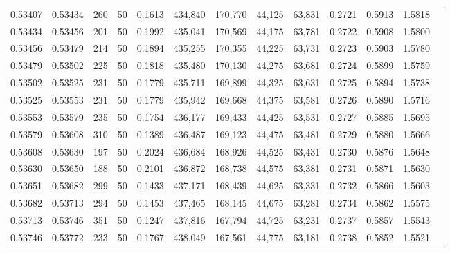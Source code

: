 \begin{tabular}{rrrrrrrrrrrrr}
0.53407 & 0.53434 &   260 &  50 &                                     0.1613 & 434,840 & 170,770 &  44,125 &  63,831 & 0.2721 & 0.5913 & 1.5818 \\
0.53434 & 0.53456 &   201 &  50 &                                     0.1992 & 435,041 & 170,569 &  44,175 &  63,781 & 0.2722 & 0.5908 & 1.5800 \\
0.53456 & 0.53479 &   214 &  50 &                                     0.1894 & 435,255 & 170,355 &  44,225 &  63,731 & 0.2723 & 0.5903 & 1.5780 \\
0.53479 & 0.53502 &   225 &  50 &                                     0.1818 & 435,480 & 170,130 &  44,275 &  63,681 & 0.2724 & 0.5899 & 1.5759 \\
0.53502 & 0.53525 &   231 &  50 &                                     0.1779 & 435,711 & 169,899 &  44,325 &  63,631 & 0.2725 & 0.5894 & 1.5738 \\
0.53525 & 0.53553 &   231 &  50 &                                     0.1779 & 435,942 & 169,668 &  44,375 &  63,581 & 0.2726 & 0.5890 & 1.5716 \\
0.53553 & 0.53579 &   235 &  50 &                                     0.1754 & 436,177 & 169,433 &  44,425 &  63,531 & 0.2727 & 0.5885 & 1.5695 \\
0.53579 & 0.53608 &   310 &  50 &                                     0.1389 & 436,487 & 169,123 &  44,475 &  63,481 & 0.2729 & 0.5880 & 1.5666 \\
0.53608 & 0.53630 &   197 &  50 &                                     0.2024 & 436,684 & 168,926 &  44,525 &  63,431 & 0.2730 & 0.5876 & 1.5648 \\
0.53630 & 0.53650 &   188 &  50 &                                     0.2101 & 436,872 & 168,738 &  44,575 &  63,381 & 0.2731 & 0.5871 & 1.5630 \\
0.53651 & 0.53682 &   299 &  50 &                                     0.1433 & 437,171 & 168,439 &  44,625 &  63,331 & 0.2732 & 0.5866 & 1.5603 \\
0.53682 & 0.53713 &   294 &  50 &                                     0.1453 & 437,465 & 168,145 &  44,675 &  63,281 & 0.2734 & 0.5862 & 1.5575 \\
0.53713 & 0.53746 &   351 &  50 &                                     0.1247 & 437,816 & 167,794 &  44,725 &  63,231 & 0.2737 & 0.5857 & 1.5543 \\
0.53746 & 0.53772 &   233 &  50 &                                     0.1767 & 438,049 & 167,561 &  44,775 &  63,181 & 0.2738 & 0.5852 & 1.5521 \\

\end{tabular}
